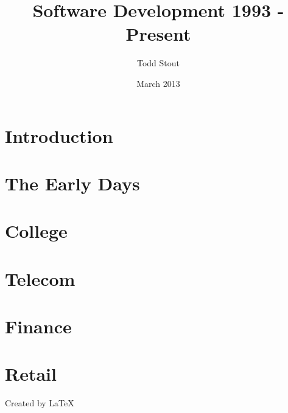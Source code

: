 \documentclass[12pt]{book}
\begin{document}
\title{Software Development 1993 - Present}
\author{Todd Stout}
\date{March 2013}

\maketitle


\tableofcontents

\chapter{Introduction}


\chapter{The Early Days}


\chapter{College}


\chapter{Telecom}


\chapter{Finance}


\chapter{Retail}


Created by \LaTeX\
	
\end{document}
